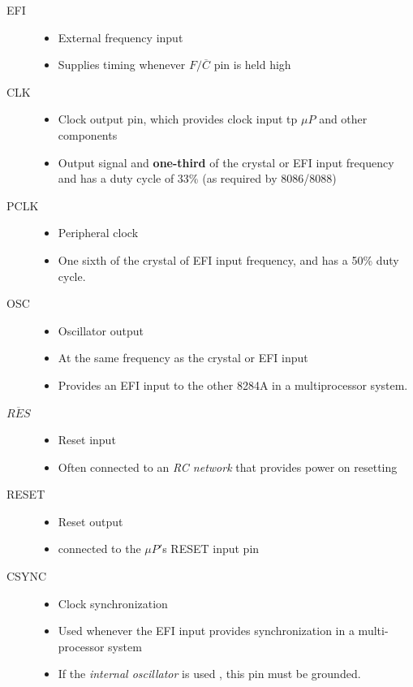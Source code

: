 \begin{description}
  \item[EFI]
  \begin{itemize}
    \item External frequency input
    \item Supplies timing whenever $F/\overline{C}$ pin is held high
  \end{itemize}

  \item[CLK]
  \begin{itemize}
    \item Clock output pin, which provides clock input tp $\mu P$ and other components
    \item Output signal and \textbf{one-third} of the crystal or EFI input frequency and has a duty cycle of 33\% (as required by 8086/8088)
  \end{itemize}

  \item[PCLK]
  \begin{itemize}
    \item Peripheral clock
    \item One sixth of the crystal of EFI input frequency, and has a 50\% duty cycle.
  \end{itemize}

  \item[OSC]
  \begin{itemize}
    \item Oscillator output
    \item At the same frequency as the crystal or EFI input
    \item Provides an EFI input to the other 8284A in a multiprocessor system.
  \end{itemize}

  \item[$\overline{RES}$]
  \begin{itemize}
    \item Reset input
    \item Often connected to an \textit{RC network} that provides power on resetting
  \end{itemize}

  \item[RESET]
  \begin{itemize}
    \item Reset output
    \item connected to the $\mu P'$s RESET input pin
  \end{itemize}

  \item[CSYNC]
  \begin{itemize}
    \item Clock synchronization
    \item Used whenever the EFI input provides synchronization in a multi-processor system
    \item If the \textit{internal oscillator} is used , this pin must be grounded.
  \end{itemize}


\end{description}
